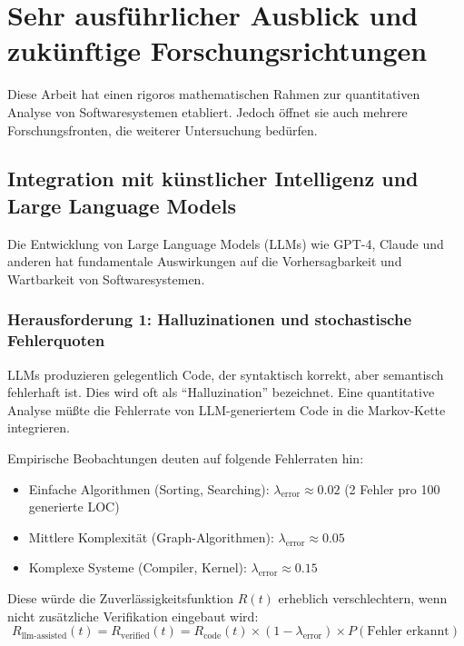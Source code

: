 \documentclass[a4paper,11pt]{article}
\theoremstyle{definition}
\begin{document}
\section{Sehr ausführlicher Ausblick und zukünftige Forschungsrichtungen}

Diese Arbeit hat einen rigoros mathematischen Rahmen zur quantitativen Analyse von 
Softwaresystemen etabliert. Jedoch öffnet sie auch mehrere Forschungsfronten, die 
weiterer Untersuchung bedürfen.

\subsection{Integration mit künstlicher Intelligenz und Large Language Models}

Die Entwicklung von Large Language Models (LLMs) wie GPT-4, Claude und anderen hat 
fundamentale Auswirkungen auf die Vorhersagbarkeit und Wartbarkeit von Softwaresystemen.

\subsubsection{Herausforderung 1: Halluzinationen und stochastische Fehlerquoten}

LLMs produzieren gelegentlich Code, der syntaktisch korrekt, aber semantisch fehlerhaft ist. 
Dies wird oft als ``Halluzination'' bezeichnet. Eine quantitative Analyse müßte die Fehlerrate 
von LLM-generiertem Code in die Markov-Kette integrieren.

Empirische Beobachtungen deuten auf folgende Fehlerraten hin:
\begin{itemize}
    \item Einfache Algorithmen (Sorting, Searching): $\lambda_{\text{error}} \approx 0.02$ 
          (2 Fehler pro 100 generierte LOC)
    \item Mittlere Komplexität (Graph-Algorithmen): $\lambda_{\text{error}} \approx 0.05$
    \item Komplexe Systeme (Compiler, Kernel): $\lambda_{\text{error}} \approx 0.15$
\end{itemize}

Diese würde die Zuverlässigkeitsfunktion $R(t)$ erheblich verschlechtern, wenn nicht 
zusätzliche Verifikation eingebaut wird:
\[
    R_{\text{llm-assisted}}(t) = R_{\text{verified}}(t) = R_{\text{code}}(t) \times (1 - \lambda_{\text{error}}) \times P(\text{Fehler erkannt})
\]
\end{document}
